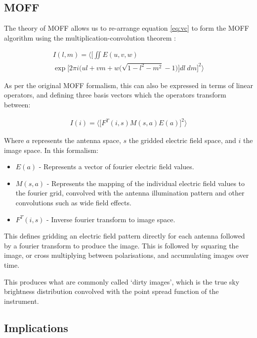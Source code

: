 \documentclass[bibliography=totocnumbered, twocolumn]{article}
\begin{document}
\subsection{MOFF}

The theory of MOFF allows us to re-arrange equation \ref{eq:vc}
to form the MOFF algorithm using the multiplication-convolution
theorem \citep{morales_enabling_2011}:

\begin{multline} \label{eq:vc_moff}
 I(l,m) = \Bigg\langle \bigg[\iint E(u,v,w) \\ \exp\big[2\pi i \big(ul + vm + w\big(\sqrt{1-l^2-m^2}-1\big)\big]dl\: dm \bigg]^2 \Bigg \rangle
\end{multline}

As per the original MOFF formalism, this can also be expressed
in terms of linear operators, and defining three basis vectors
which the operators transform between:

\begin{align} \label{eq:linformalism}
  I(i) = \Bigg \langle \bigg[ F^T(i,s)M(s,a)E(a)\bigg]^2 \Bigg \rangle
\end{align}

Where $a$ represents the antenna space, $s$ the gridded electric
field space, and $i$ the image space. In this formalism:

\begin{itemize}
  \item $E(a)$ - Represents a vector of fourier electric field values.
  \item $M(s,a)$ - Represents the mapping of the individual electric field values to the fourier grid, convolved with the antenna illumination pattern and other convolutions such as wide field effects.
  \item $F^T(i,s)$ - Inverse fourier transform to image space.
\end{itemize}

This defines gridding an electric field pattern directly for each
antenna followed by a fourier transform to produce the image. This is
followed by squaring the image, or cross multiplying between
polarisations, and accumulating images over time.

This produces what are commonly called `dirty images', which is the
true sky brightness distribution convolved with the point spread
function of the instrument.

\subsection{Implications}
\end{document}
